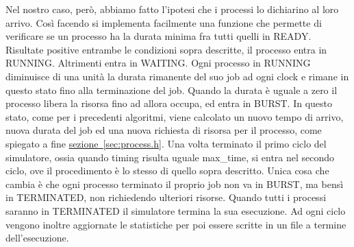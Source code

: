 \documentclass[Lau, oneside]{sapthesis}%
\begin{document}
Nel nostro caso, però, abbiamo fatto l'ipotesi che i processi lo dichiarino al loro arrivo.
Così facendo si implementa facilmente una funzione che permette di verificare se un processo ha la durata minima fra tutti quelli in READY.
Risultate positive entrambe le condizioni sopra descritte, il processo entra in RUNNING.
Altrimenti entra in WAITING.
Ogni processo in RUNNING diminuisce di una unità la durata rimanente del suo job ad ogni clock e rimane in questo stato fino alla terminazione del job.
Quando la durata è uguale a zero il processo libera la risorsa fino ad allora occupa, ed entra in BURST.
In questo stato, come per i precedenti algoritmi, viene calcolato un nuovo tempo di arrivo, nuova durata del job ed una nuova richiesta di risorsa per il processo, come spiegato a fine \hyperref[sec:process.h]{sezione~\ref*{sec:process.h}}.
Una volta terminato il primo ciclo del simulatore, ossia quando timing risulta uguale max\_time, si entra nel secondo ciclo, ove il procedimento è lo stesso di quello sopra descritto.
Unica cosa che cambia è che ogni processo terminato il proprio job non va in BURST, ma bensì in TERMINATED, non richiedendo ulteriori risorse.
Quando tutti i processi saranno in TERMINATED il simulatore termina la sua esecuzione.
Ad ogni ciclo vengono inoltre aggiornate le statistiche per poi essere scritte in un file a termine dell'esecuzione.
\end{document}
